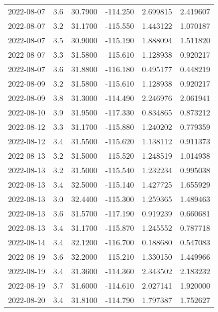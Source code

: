 \begin{tabular}{lrrrrr}
2022-08-07 &       3.6 &  30.7900 &  -114.250 &         2.699815 &         2.419607 \\
2022-08-07 &       3.2 &  31.1700 &  -115.550 &         1.443122 &         1.070187 \\
2022-08-07 &       3.5 &  30.9000 &  -115.190 &         1.888094 &         1.511820 \\
2022-08-07 &       3.3 &  31.5800 &  -115.610 &         1.128938 &         0.920217 \\
2022-08-07 &       3.6 &  31.8800 &  -116.180 &         0.495177 &         0.448219 \\
2022-08-09 &       3.2 &  31.5800 &  -115.610 &         1.128938 &         0.920217 \\
2022-08-09 &       3.8 &  31.3000 &  -114.490 &         2.246976 &         2.061941 \\
2022-08-10 &       3.9 &  31.9500 &  -117.330 &         0.834865 &         0.873212 \\
2022-08-12 &       3.3 &  31.1700 &  -115.880 &         1.240202 &         0.779359 \\
2022-08-12 &       3.4 &  31.5500 &  -115.620 &         1.138112 &         0.911373 \\
2022-08-13 &       3.2 &  31.5000 &  -115.520 &         1.248519 &         1.014938 \\
2022-08-13 &       3.2 &  31.5000 &  -115.540 &         1.232234 &         0.995038 \\
2022-08-13 &       3.4 &  32.5000 &  -115.140 &         1.427725 &         1.655929 \\
2022-08-13 &       3.0 &  32.4400 &  -115.300 &         1.259365 &         1.489463 \\
2022-08-13 &       3.6 &  31.5700 &  -117.190 &         0.919239 &         0.660681 \\
2022-08-13 &       3.4 &  31.1700 &  -115.870 &         1.245552 &         0.787718 \\
2022-08-14 &       3.4 &  32.1200 &  -116.700 &         0.188680 &         0.547083 \\
2022-08-19 &       3.6 &  32.2000 &  -115.210 &         1.330150 &         1.449966 \\
2022-08-19 &       3.4 &  31.3600 &  -114.360 &         2.343502 &         2.183232 \\
2022-08-19 &       3.7 &  31.6000 &  -114.610 &         2.027141 &         1.920000 \\
2022-08-20 &       3.4 &  31.8100 &  -114.790 &         1.797387 &         1.752627 \\

\end{tabular}
